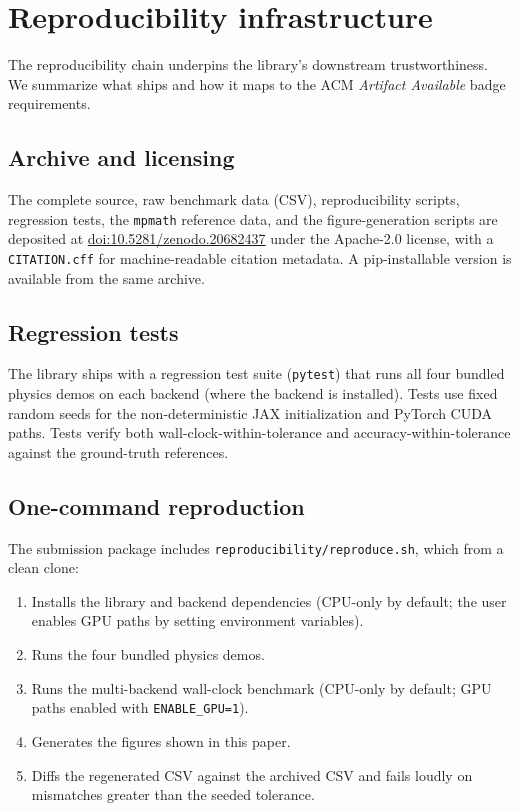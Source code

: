 \documentclass[manuscript,review]{acmart}
\begin{document}
\section{Reproducibility infrastructure}\label{sec:reproducibility}

The reproducibility chain underpins the library's downstream
trustworthiness. We summarize what ships and how it maps to the ACM
\emph{Artifact Available} badge requirements.

\subsection{Archive and licensing}

The complete source, raw benchmark data (CSV), reproducibility
scripts, regression tests, the \texttt{mpmath} reference data, and
the figure-generation scripts are deposited at
\href{https://doi.org/10.5281/zenodo.20682437}{doi:10.5281/zenodo.20682437}
under the Apache-2.0 license, with a \texttt{CITATION.cff} for
machine-readable citation metadata. A pip-installable version is
available from the same archive.

\subsection{Regression tests}

The library ships with a regression test suite (\texttt{pytest})
that runs all four bundled physics demos on each backend (where the
backend is installed). Tests use fixed random seeds for the
non-deterministic JAX initialization and PyTorch CUDA paths. Tests
verify both wall-clock-within-tolerance and accuracy-within-tolerance
against the ground-truth references.

\subsection{One-command reproduction}

The submission package includes \texttt{reproducibility/reproduce.sh},
which from a clean clone:
\begin{enumerate}[label=(\arabic*),leftmargin=*]
\item Installs the library and backend dependencies (CPU-only by
default; the user enables GPU paths by setting environment
variables).
\item Runs the four bundled physics demos.
\item Runs the multi-backend wall-clock benchmark
(CPU-only by default; GPU paths enabled with
\texttt{ENABLE\_GPU=1}).
\item Generates the figures shown in this paper.
\item Diffs the regenerated CSV against the archived CSV and fails
loudly on mismatches greater than the seeded tolerance.
\end{enumerate}
\end{document}
